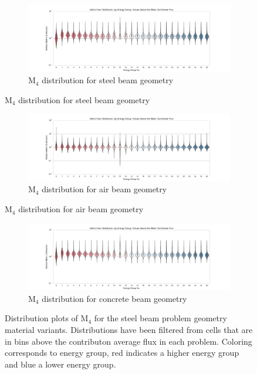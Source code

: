 \begin{figure}[htb!]
  \centering
  \begin{subfigure}[t]{\textwidth}
    \includegraphics[width=\linewidth]{./chapters/characterization_probs/figures/char/prob_1/metric_four_violin_mean.pdf}
    \caption{M$_4$ distribution for steel beam geometry}
    \label{fig:beamsteelviolins}
  \end{subfigure}
\end{figure}
\begin{figure}[htb!]\ContinuedFloat
  \centering
  \begin{subfigure}[t]{\textwidth}
    \includegraphics[width=\linewidth]{./chapters/characterization_probs/figures/char/prob1v1/metric_four_violin_mean.pdf}
    \caption{M$_4$ distribution for air beam geometry}
    \label{fig:beamairviolins}
  \end{subfigure}
\end{figure}
\begin{figure}[htb!]\ContinuedFloat
  \centering
  \begin{subfigure}[t]{\textwidth}
    \includegraphics[width=\linewidth]{./chapters/characterization_probs/figures/char/prob1v2/metric_four_violin_mean.pdf}
    \caption{M$_4$ distribution for concrete beam geometry}
    \label{fig:beamconcreteviolins}
  \end{subfigure}
  \caption[Distribution plots of M$_4$ for the steel beam problem geometry
  material variants.]{Distribution plots of M$_4$ for the steel beam problem
  geometry material variants. Distributions have been filtered from cells that
  are in bins above the contributon average flux in each problem. Coloring
corresponds to energy group, red indicates a higher energy group and blue a
lower energy group. }
  \label{fig:beamviolins}
\end{figure}

